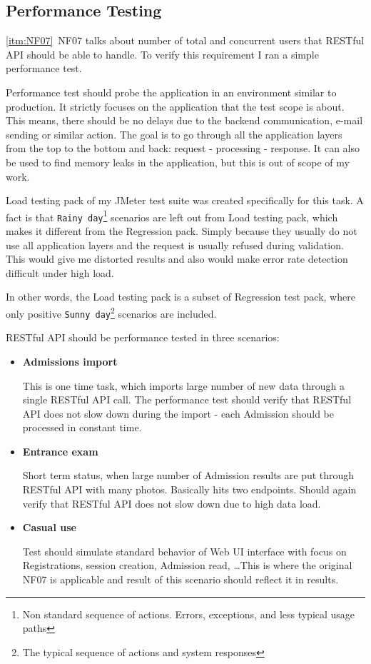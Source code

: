 	\subsection{Performance Testing}
	
	\ref{itm:NF07}~NF07 talks about number of total and concurrent users that RESTful API should be able to handle. To
	verify this requirement I ran a simple performance test.
	
	Performance test should probe the application in an environment similar to production.
	It strictly focuses on the application that the test scope is about. This means, there should be no delays due to
	the backend communication, e-mail sending or similar action. The goal is to go through all the application layers from
	the top to the bottom and back: request - processing - response. It can also be used to find memory leaks in the
	application, but this is out of scope of my work.
	
	Load testing pack of my JMeter test suite was created specifically for this task. A fact is
	that \verb|Rainy day|\footnote{Non standard sequence of actions. Errors, exceptions, and less typical usage paths}
	scenarios are left out from Load testing pack, which makes it different from the Regression pack. Simply because they
	usually do not use all application layers and the request is usually refused during validation. This would give me
	distorted results and also would make error rate detection difficult under high load.
	
	In other words, the Load testing pack is a subset of Regression test pack, where only positive
	\verb|Sunny day|\footnote{The typical sequence of actions and system responses} scenarios are included.
	
	RESTful API should be performance tested in three scenarios:
	
	\begin{itemize}
		\item \textbf{Admissions import}
		
		This is one time task, which imports large number of new data through a single RESTful API call. The performance test
		should verify that RESTful API does not slow down during the import - each Admission should be processed in constant
		time.
		\item \textbf{Entrance exam}
		
		Short term status, when large number of Admission results are put through RESTful API with many photos. Basically hits
		two endpoints. Should again verify that RESTful API does not slow down due to high data load.
		\item \textbf{Casual use}
		
		Test should simulate standard behavior of Web UI interface with focus on Registrations, session creation, Admission
		read, \ldots This is where the original NF07 is applicable and result of this scenario should reflect it in results.
	\end{itemize}
	
